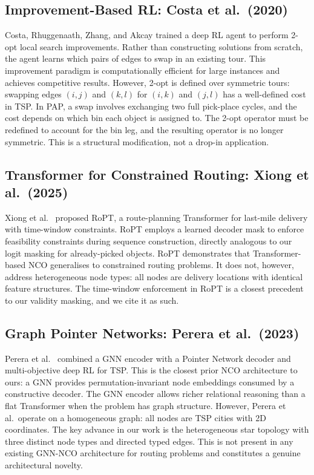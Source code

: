 \documentclass[conference]{IEEEtran}
\begin{document}
\subsection{Improvement-Based RL: Costa et al.\ (2020)}

Costa, Rhuggenaath, Zhang, and Akcay \cite{costa2020learning2opt} trained a deep RL agent to perform 2-opt local search improvements. Rather than constructing solutions from scratch, the agent learns which pairs of edges to swap in an existing tour. This improvement paradigm is computationally efficient for large instances and achieves competitive results. However, 2-opt is defined over symmetric tours: swapping edges $(i,j)$ and $(k,l)$ for $(i,k)$ and $(j,l)$ has a well-defined cost in TSP. In PAP, a swap involves exchanging two full pick-place cycles, and the cost depends on which bin each object is assigned to. The 2-opt operator must be redefined to account for the bin leg, and the resulting operator is no longer symmetric. This is a structural modification, not a drop-in application.

\subsection{Transformer for Constrained Routing: Xiong et al.\ (2025)}

Xiong et al.\ \cite{xiong2025ropt} proposed RoPT, a route-planning Transformer for last-mile delivery with time-window constraints. RoPT employs a learned decoder mask to enforce feasibility constraints during sequence construction, directly analogous to our logit masking for already-picked objects. RoPT demonstrates that Transformer-based NCO generalises to constrained routing problems. It does not, however, address heterogeneous node types: all nodes are delivery locations with identical feature structures. The time-window enforcement in RoPT is a closest precedent to our validity masking, and we cite it as such.

\subsection{Graph Pointer Networks: Perera et al.\ (2023)}

Perera et al.\ \cite{perera2023gpn} combined a GNN encoder with a Pointer Network decoder and multi-objective deep RL for TSP. This is the closest prior NCO architecture to ours: a GNN provides permutation-invariant node embeddings consumed by a constructive decoder. The GNN encoder allows richer relational reasoning than a flat Transformer when the problem has graph structure. However, Perera et al.\ operate on a homogeneous graph: all nodes are TSP cities with 2D coordinates. The key advance in our work is the heterogeneous star topology with three distinct node types and directed typed edges. This is not present in any existing GNN-NCO architecture for routing problems and constitutes a genuine architectural novelty.
\end{document}
